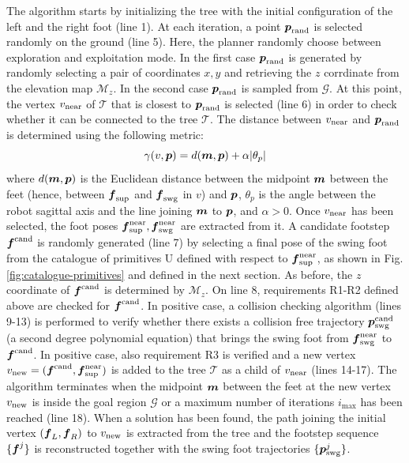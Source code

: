 The algorithm starts by initializing the tree with the initial configuration of 
the left and the right foot (line 1). At each iteration, a point 
${\mbox{\boldmath $p$}}_{\rm {rand}}$ is selected randomly on the ground (line 5). Here, the 
planner randomly choose between exploration and exploitation mode. In the first 
case ${\mbox{\boldmath $p$}}_{\rm {rand}}$ is generated by randomly selecting a pair of 
coordinates $x, y$ and retrieving the $z$ corrdinate from the elevation map 
$\mathcal{M}_z$. In the second case ${\mbox{\boldmath $p$}}_{\rm {rand}}$ is sampled from
$\mathcal{G}$. At this point, the vertex $v_{\rm {near}}$ of $\mathcal{T}$
that is closest to ${\mbox{\boldmath $p$}}_{\rm {rand}}$ is selected (line 6) in order to check
whether it can be connected to the tree $\mathcal{T}$. The distance between
$v_{\rm {near}}$ and ${\mbox{\boldmath $p$}}_{\rm {rand}}$ is determined using the following
metric:
\begin{equation}
  \gamma(v, {\mbox{\boldmath $p$}}) = d({\mbox{\boldmath $m$}}, {\mbox{\boldmath $p$}}) + \alpha |\theta_p|
\end{equation}
where $d({\mbox{\boldmath $m$}}, {\mbox{\boldmath $p$}})$ is the Euclidean distance between the midpoint ${\mbox{\boldmath $m$}}$
between the feet (hence, between ${\mbox{\boldmath $f$}}_{\rm {sup}}$ and ${\mbox{\boldmath $f$}}_{\rm {swg}}$ in
$v$) and ${\mbox{\boldmath $p$}}$, $\theta_p$ is the angle between the robot sagittal axis and 
the line joining ${\mbox{\boldmath $m$}}$ to ${\mbox{\boldmath $p$}}$, and $\alpha>0$. Once $v_{\rm near}$ has been 
selected, the foot poses ${\mbox{\boldmath $f$}}_{\rm sup}^{\rm near}, 
{\mbox{\boldmath $f$}}_{\rm {swg}}^{\rm near}$ are extracted from it. A candidate footstep
${\mbox{\boldmath $f$}}^{\rm cand}$ is randomly generated (line 7) by selecting a final pose of
the swing foot from the catalogue of primitives U defined with respect to 
${\mbox{\boldmath $f$}}_{\rm sup}^{\rm near}$, as shown in Fig. \ref{fig:catalogue-primitives} and 
defined in the next section. As before, the $z$ coordinate of ${\mbox{\boldmath $f$}}^{\rm cand}$
is determined by $\mathcal{M}_z$. On line 8, requirements R1-R2 defined above 
are checked for ${\mbox{\boldmath $f$}}^{\rm cand}$. In positive case, a collision checking 
algorithm (lines 9-13) is performed to verify whether there exists a collision 
free trajectory ${\mbox{\boldmath $p$}}_{\rm swg}^{\rm cand}$ (a second degree polynomial
equation)
that brings the swing foot from 
${\mbox{\boldmath $f$}}_{\rm swg}^{\rm near}$ to ${\mbox{\boldmath $f$}}^{\rm cand}$. In positive case, also 
requirement R3 is verified and a new vertex $v_{\rm new} = ({\mbox{\boldmath $f$}}^{\rm cand}, 
{\mbox{\boldmath $f$}}_{\rm \sup}^{\rm near})$ is added to the tree $\mathcal{T}$ as a child of 
$v_{\rm near}$ (lines 14-17). The algorithm terminates when the midpoint 
${\mbox{\boldmath $m$}}$ between the feet at the new vertex $v_{\rm new}$ is inside the goal 
region $\mathcal{G}$ or a maximum number of iterations $i_{\max}$ has been 
reached (line 18). When a solution has been found, the path joining the 
initial vertex $({\mbox{\boldmath $f$}}_L, {\mbox{\boldmath $f$}}_R)$ to $v_{\rm new}$ is extracted from the tree 
and the footstep sequence $\{{\mbox{\boldmath $f$}}^j\}$ is reconstructed together with the 
swing foot trajectories $\{{\mbox{\boldmath $p$}}_{\rm swg}^j\}$.

